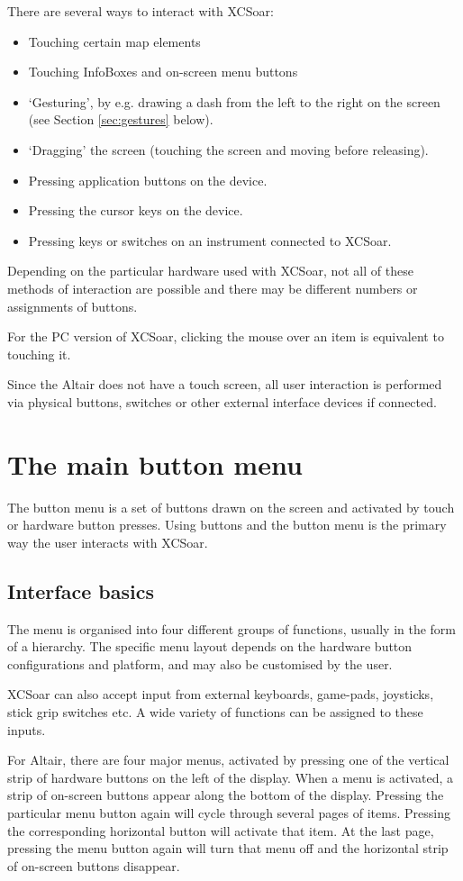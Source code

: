 There are several ways to interact with XCSoar:
\begin{itemize}
\item Touching certain map elements
\item Touching InfoBoxes and on-screen menu buttons
\item `Gesturing', by e.g. drawing a dash from the left to the right
  on the screen (see Section \ref{sec:gestures} below).
\item `Dragging' the screen (touching the screen and moving before releasing).
\item Pressing application buttons on the device.
\item Pressing the cursor keys on the device.
\item Pressing keys or switches on an instrument connected to XCSoar.
\end{itemize}
Depending on the particular hardware used with XCSoar, not all of these methods
of interaction are possible and there may be different numbers or assignments
of buttons.

For the PC version of XCSoar, clicking the mouse over an item is equivalent to
touching it.

Since the Altair does not have a touch screen, all user interaction is performed
via physical buttons, switches or other external interface devices if connected.

\section{The main button menu}
The button menu is a set of buttons drawn on the screen and activated by touch
or hardware button presses.  Using buttons and the button menu is the primary
way the user interacts with XCSoar.

\subsection*{Interface basics}
The menu is organised into four different groups of functions, usually in
the form of a hierarchy.  The specific menu layout depends on the
hardware button configurations and platform, and may also be customised by the
user.

XCSoar can also accept input from external keyboards, game-pads, joysticks,
stick grip switches etc. A wide variety of functions can be assigned to these
inputs.

For Altair, there are four major menus, activated by pressing one of
the vertical strip of hardware buttons on the left of the display.
When a menu is activated, a strip of on-screen buttons appear along the
bottom of the display.  Pressing the particular menu button again will
cycle through several pages of items.  Pressing the corresponding
horizontal button will activate that item.  At the last page, pressing
the menu button again will turn that menu off and the horizontal strip
of on-screen buttons disappear.

